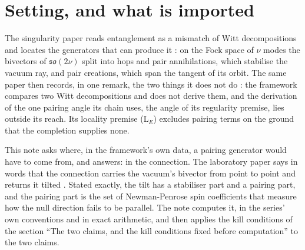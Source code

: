 \documentclass[11pt]{article}
\theoremstyle{definition}
\theoremstyle{plain}
\providecommand{\so}{}\renewcommand{\so}{\mathfrak{so}}
\begin{document}
\noindent{}
\newpage

\section{Setting, and what is imported}

\label{c:note.pairing.setting-setting-what-imported}
The singularity paper reads entanglement as a mismatch of Witt decompositions and locates the generators that can produce it \cite[Prop.~13.4]{ButlerT5}: on the Fock space of $\nu$ modes the bivectors of $\so(2\nu)$ split into hops and pair annihilations, which stabilise the vacuum ray, and pair creations, which span the tangent of its orbit. The same paper then records, in one remark, the two things it does not do \cite[Rem.~13.5]{ButlerT5}: the framework compares two Witt decompositions and does not derive them, and the derivation of the one pairing angle its chain uses, the angle of its regularity premise, lies outside its reach. Its locality premise (L$_E$) \cite[Prem.~7.30]{ButlerT5} excludes pairing terms on the ground that the completion supplies none.

This note asks where, in the framework's own data, a pairing generator would have to come from, and answers: in the connection. The laboratory paper says in words that the connection carries the vacuum's bivector from point to point and returns it tilted \cite[Prop.~4.1(3) and the paragraph following it]{ButlerT16}. Stated exactly, the tilt has a stabiliser part and a pairing part, and the pairing part is the set of Newman-Penrose spin coefficients that measure how the null direction fails to be parallel. The note computes it, in the series' own conventions and in exact arithmetic, and then applies the kill conditions of the section ``The two claims, and the kill conditions fixed before computation'' to the two claims.
\end{document}
